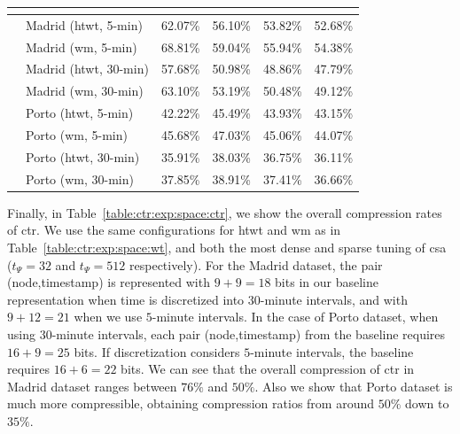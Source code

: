 \begin{table}[ht]
\begin{center}
\begin{tabular}{|c|l|*{4}{c}|}
	  \multicolumn{5}{c}{} \\
	  \hline   
	  \multirow{8}{*}{\STAB{\rotatebox[origin=c]{90}{$t_{\Psi}=512$}}}
	   & Madrid (\gls{htwt}, 5-min) & 62.07\% &	56.10\% &	53.82\% &	 52.68\% \\
	   & Madrid (\gls{wm}, 5-min)   & 68.81\% &	59.04\% &	55.94\% &	 54.38\% \\
	   & Madrid (\gls{htwt}, 30-min) &  57.68\% &	50.98\% &	48.86\% &	 47.79\% \\
	   & Madrid (\gls{wm}, 30-min)  & 63.10\% &	53.19\% &	50.48\% &	 49.12\% \\
	  \cline{2-6}
	   & Porto (\gls{htwt}, 5-min)   & 42.22\% &	45.49\% &	43.93\% &	 43.15\% \\
	   & Porto (\gls{wm}, 5-min)      & 45.68\% &	47.03\% &	45.06\% &	 44.07\% \\
	   & Porto (\gls{htwt}, 30-min)  & 35.91\% &	38.03\% &	36.75\% &	 36.11\% \\
	   & Porto (\gls{wm}, 30-min)   & 37.85\% &	38.91\% &	37.41\% &	 36.66\% \\
	  \hline
	  \end{tabular}
	\end{center}
	\end{table}


	Finally, in Table~\ref{table:ctr:exp:space:ctr}, we show the overall compression rates of  \gls{ctr}.
	We use the same configurations for \gls{htwt} and \gls{wm}  as in Table~\ref{table:ctr:exp:space:wt}, and both the
	most dense and sparse tuning of \gls{csa} ($t_{\Psi}= 32$ and $t_{\Psi}= 512$ respectively).
	For the Madrid dataset, the pair (node,timestamp) is represented with $9+9=18$ bits in our baseline representation 
	when time is discretized into $30$-minute intervals, and with $9+12=21$ when we use $5$-minute intervals.
	In the case of Porto dataset, when using $30$-minute intervals, each pair (node,timestamp) from the baseline requires $16+9=25$ bits. 
	If discretization considers $5$-minute intervals, the baseline requires $16+6=22$ bits. We can see that the overall
	compression of \gls{ctr} in Madrid dataset ranges between $76\%$ and $50\%$. Also we show that Porto dataset is much
	more compressible, obtaining compression ratios from around $50\%$ down to $35\%$.



